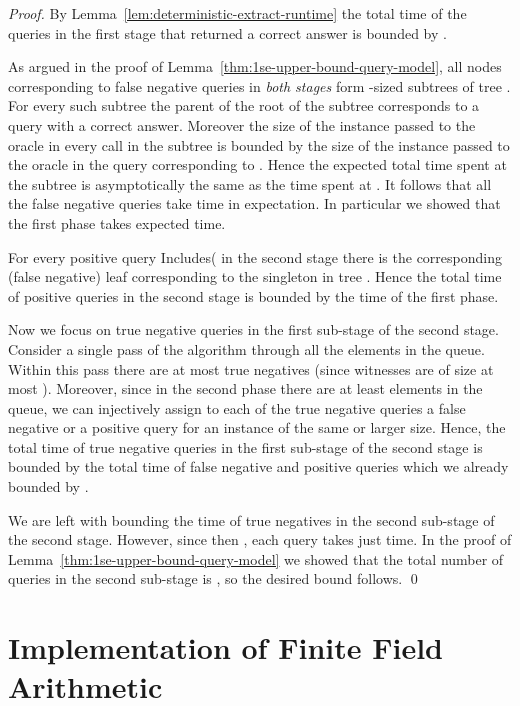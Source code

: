 \documentclass[11pt]{article}
\begin{document}
\begin{proof}
 By Lemma~\ref{lem:deterministic-extract-runtime} the total time of the queries in the first stage that returned a correct answer is bounded by . 
 
 As argued in the proof of Lemma~\ref{thm:1se-upper-bound-query-model}, all nodes corresponding to false negative queries in {\em both stages} form -sized subtrees of tree . For every such subtree the parent  of the root of the subtree corresponds to a query with a correct answer. Moreover the size of the instance passed to the oracle in every call in the subtree is bounded by the size of the instance passed to the oracle in the query corresponding to . Hence the expected total time spent at the subtree is asymptotically the same as the time spent at . It follows that all the false negative queries take  time in expectation. In particular we showed that the first phase takes  expected time.
 
 For every positive query {\sc Includes}( in the second stage there is the corresponding (false negative) leaf corresponding to the singleton  in tree . Hence the total time of positive queries in the second stage is bounded by the time of the first phase.
 
 Now we focus on true negative queries in the first sub-stage of the second stage. Consider a single pass of the algorithm through all the elements in the queue.
 Within this pass there are at most  true negatives (since witnesses are of size at most ). Moreover, since in the second phase there are at least  elements in the queue, we can injectively assign to each of the true negative queries a false negative or a positive query for an instance of the same or larger size. Hence, the total time of true negative queries in the first sub-stage of the second stage is bounded by the total time of 
  false negative and positive queries which we already bounded by .
 
 We are left with bounding the time of true negatives in the second sub-stage of the second stage. However, since then , each query takes just  time. In the proof of Lemma~\ref{thm:1se-upper-bound-query-model} we showed that the total number of queries in the second sub-stage is , so the desired bound follows. \qed
 \end{proof}




\section{Implementation of Finite Field Arithmetic}
\label{sec:gf-impl}
\end{document}
